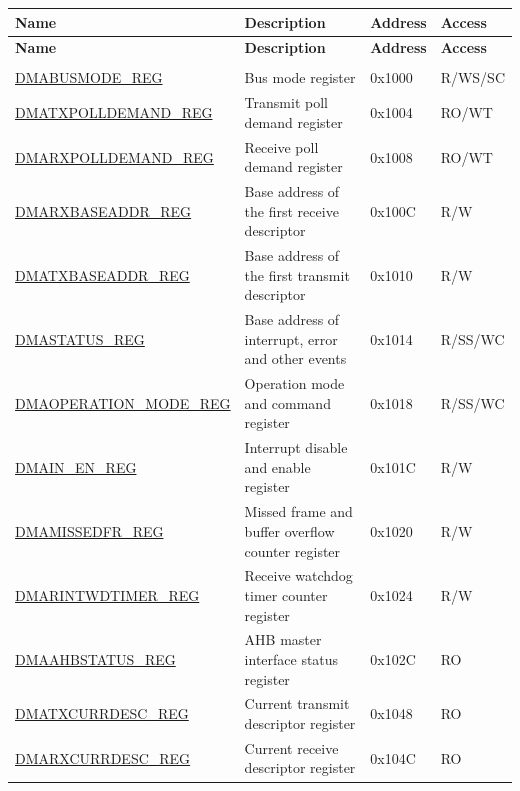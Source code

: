 \begin{longtable}{ |m{6cm} |m{5.3cm} | m{2cm} | m{2.2cm} | }
\hline\rowcolor{lightgray}
\textbf{Name} & \textbf{Description} &  \textbf{Address} & \textbf{Access} \\ \hline
\endfirsthead
\hline
\rowcolor{lightgray}
\textbf{Name} & \textbf{Description} &  \textbf{Address} & \textbf{Access} \\ \hline
\endhead
\hline
\endfoot
\hline
\endlastfoot

\multicolumn{4}{|l|}{\textbf{DMA configuration and control registers}} \\ \hline
\hyperref[regdesc:DMABUSMODEREG]{DMABUSMODE\_REG} & Bus mode register & 0x1000 & R/WS/SC \\ \hline
\hyperref[regdesc:DMATXPOLLDEMANDREG]{DMATXPOLLDEMAND\_REG} &  Transmit poll demand register & 0x1004 & RO/WT \\ \hline
\hyperref[regdesc:DMARXPOLLDEMANDREG]{DMARXPOLLDEMAND\_REG} & Receive poll demand register & 0x1008 & RO/WT \\ \hline
\hyperref[regdesc:DMARXBASEADDRREG]{DMARXBASEADDR\_REG} &  Base address of the first receive descriptor & 0x100C & R/W \\ \hline
\hyperref[regdesc:DMATXBASEADDRREG]{DMATXBASEADDR\_REG} &  Base address of the first transmit descriptor & 0x1010 & R/W \\ \hline
\hyperref[regdesc:DMASTATUSREG]{DMASTATUS\_REG} & Base address of interrupt, error and other events & 0x1014 & R/SS/WC \\ \hline
\hyperref[regdesc:DMAOPERATIONMODEREG]{DMAOPERATION\_MODE\_REG} & Operation mode and command register & 0x1018 & R/SS/WC \\ \hline
\hyperref[regdesc:DMAINENREG]{DMAIN\_EN\_REG} & Interrupt disable and enable register & 0x101C & R/W \\ \hline
\hyperref[regdesc:DMAMISSEDFRREG]{DMAMISSEDFR\_REG} & Missed frame and buffer overflow counter register & 0x1020 & R/W \\ \hline
\hyperref[regdesc:DMARINTWDTIMERREG]{DMARINTWDTIMER\_REG} &  Receive watchdog timer counter register & 0x1024 & R/W \\ \hline
\hyperref[regdesc:DMAHBSTATUSREG]{DMAAHBSTATUS\_REG} &  AHB master interface status register & 0x102C & RO \\ \hline
\hyperref[regdesc:DMATXCURRDESCREG]{DMATXCURRDESC\_REG} &  Current transmit descriptor register & 0x1048 & RO \\ \hline
\hyperref[regdesc:DMARXCURRDESCREG]{DMARXCURRDESC\_REG} & Current receive descriptor register & 0x104C & RO \\ \hline

\end{longtable}
